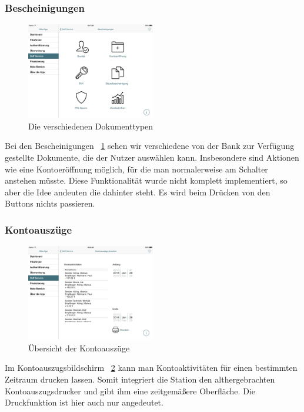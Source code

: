 \subsubsection{Bescheinigungen}
\begin{figure}[h!]
	\centering
  \includegraphics[width=0.5\textwidth]{Pictures/Bescheinigungen}
	\caption{Die verschiedenen Dokumenttypen}
	\label{fig6}
\end{figure}

	Bei den Bescheinigungen ~\ref{fig6} sehen wir verschiedene von der Bank zur Verfügung gestellte Dokumente, die der Nutzer auswählen kann. Insbesondere sind Aktionen wie eine Kontoeröffnung möglich, für die man normalerweise am Schalter anstehen müsste. Diese Funktionalität wurde nicht komplett implementiert, so aber die Idee andeuten die dahinter steht. Es wird beim Drücken von den Buttons nichts passieren.

\pagebreak
\subsubsection{Kontoauszüge}
\begin{figure}[h!]
	\centering
  \includegraphics[width=0.5\textwidth]{Pictures/kontoauszuege}
	\caption{Übersicht der Kontoauszüge}
	\label{fig7}
\end{figure}

	Im Kontoauszugsbildschirm ~\ref{fig7} kann man Kontoaktivitäten für einen bestimmten Zeitraum drucken lassen. Somit integriert die Station den althergebrachten Kontoauszugsdrucker und gibt ihm eine zeitgemäßere Oberfläche. Die Druckfunktion ist hier auch nur angedeutet.


